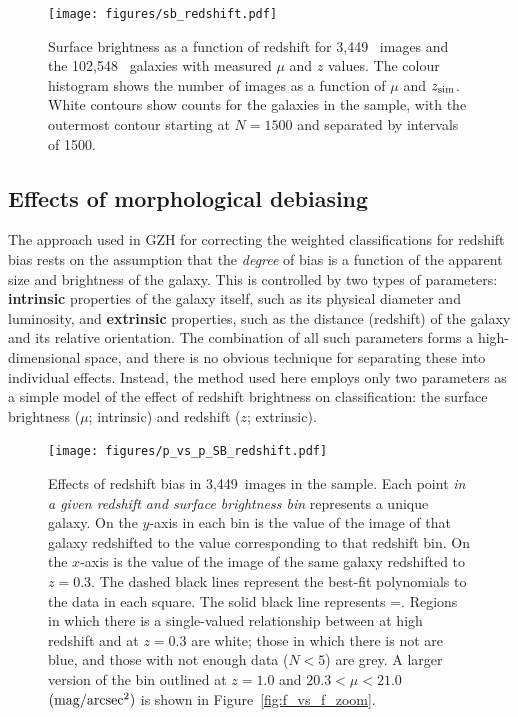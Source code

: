 \documentclass[a4paper,fleqn,usenatbib]{mnras}
\begin{document}
\begin{figure}
\begin{center}
\texttt{[image: figures/sb\_redshift.pdf]}
\caption{Surface brightness as a function of redshift for 3,449~\ferengi{}
images and the 102,548~\main{} galaxies with measured $\mu$ and $z$ values. The
colour histogram shows the number of \ferengi{} images as a function of $\mu$
and $z_{\rm sim}$. White contours show counts for the galaxies in the \main{}
sample, with the outermost contour starting at $N=1500$ and separated by
intervals of 1500.} 
\label{fig:sb_redshift}
\end{center}
\end{figure}


\subsection{Effects of morphological debiasing}\label{ssec:zeta_results}
The approach used in GZH for correcting the weighted classifications for
redshift bias rests on the assumption that the \emph{degree} of bias is a
function of the apparent size and brightness of the galaxy.
This is controlled by two types of parameters: \textbf{intrinsic} properties of
the galaxy itself, such as its physical diameter and luminosity, and
\textbf{extrinsic} properties, such as the distance (redshift) of the galaxy
and its relative orientation. The combination of all
such parameters forms a high-dimensional space, and there is no obvious technique
for separating these into individual effects. Instead, the method used here employs
only two parameters as a simple model of the effect of redshift brightness on classification: the
surface brightness ($\mu$; intrinsic) and redshift ($z$;
extrinsic).


\begin{figure}
\centering
\texttt{[image: figures/p\_vs\_p\_SB\_redshift.pdf]}
\caption{Effects of redshift bias in 3,449~images in the \ferengi{} sample.
Each point \emph{in a given redshift and surface brightness bin} represents a
unique galaxy. On the $y$-axis in each bin is the \ffeatures{} value of the
image of that galaxy redshifted to the value corresponding to that redshift
bin. On the $x$-axis is the \ffeatures{} value of the image of the same galaxy
redshifted to $z=0.3$. The dashed black lines represent the best-fit
polynomials to the data in each square. The solid black line represents
\ffeaturesz=\ffeaturesrest. Regions in which there is a single-valued
relationship between \ffeatures{} at high redshift and at $z=0.3$ are white;
those in which there is not are blue, and those with not enough data ($N<5$)
are grey. A larger version of the bin outlined at $z=1.0$ and $20.3 < \mu <
21.0$ $\rm (mag/arcsec^2)$ is shown in Figure~\ref{fig:f_vs_f_zoom}.}
\label{fig:f_vs_f}
\end{figure} 
\end{document}

